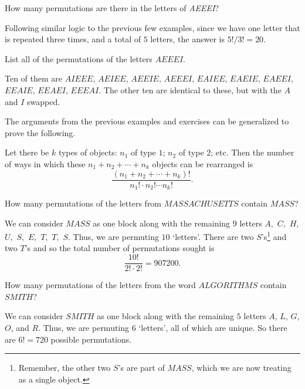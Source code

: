 \begin{exer}
How many permutations are there in the letters of {\em AEEEI}?

\noindent
\answerlinetwo
\begin{answer}
Following similar logic to the previous few examples, since we have one letter that is repeated
three times, and a total of $5$ letters, the answer is $5!/3!=20$.
\end{answer}
\end{exer}

\begin{exer}
List all of the permutations of the letters $AEEEI$.

\noindent
\answerlinethree
\begin{answer}
Ten of them are
$AIEEE$, $AEIEE$, $AEEIE$, $AEEEI$, $EAIEE$, $EAEIE$, $EAEEI$, $EEAIE$, $EEAEI$, $EEEAI$.
The other ten are identical to these, but with the $A$ and $I$ swapped.
\end{answer}
\end{exer}

The arguments from the previous examples and exercises can be generalized to prove the following.

\begin{thm}\label{thm:genPerms}
Let there be $k$ types of objects: $n_1$ of type $1$;  $n_2$ of type
$2$; etc. Then the number of ways in which these $n_1 + n_2 + \cdots
+n_k$ objects can be rearranged is $$ \frac{(n_1 + n_2 + \cdots
+n_k)!}{n_1!\cdot n_2! \cdots n_k!}. $$
\end{thm}


\begin{exa} How many permutations of the letters from
$MASSACHUSETTS$ contain $MASS$?
\begin{sol} 
We can consider $MASS$ as one block along with the remaining
$9$ letters $A,$ $C,$ $H,$ $U,$ $S,$ $E,$ $T,$ $T,$ $S$. Thus, we are
permuting $10$ `letters'.
There are two $S$'s\footnote{Remember, the other two $S$'s are part of $MASS$, which we are
now treating as a single object.} 
and two $T$'s and so the total number of permutations sought is
$$\frac{10!}{2!\cdot 2!} = 907200.
$$
\end{sol}
\end{exa}

\begin{exer} 
How many permutations of the letters from the word 
$ALGORITHMS$ contain $SMITH$?

\noindent
\answerlinethree
\begin{answer} 
We can consider $SMITH$ as one block along with the remaining
$5$ letters $A$, $L$, $G$, $O$, and $R$. Thus, we are
permuting $6$ `letters', all of which are unique.  So there are
$6!=720$ possible permutations.
\end{answer}
\end{exer}


